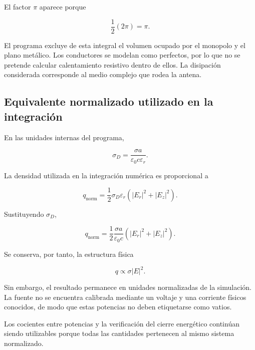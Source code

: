 El factor $\pi$ aparece porque

\begin{equation}
\frac{1}{2}(2\pi)=\pi.
\end{equation}

El programa excluye de esta integral el volumen ocupado por el monopolo y el plano metálico. Los conductores se modelan como perfectos, por lo que no se pretende calcular calentamiento resistivo dentro de ellos. La disipación considerada corresponde al medio complejo que rodea la antena.

\subsection{Equivalente normalizado utilizado en la integración}

En las unidades internas del programa,

\begin{equation}
\sigma_D
=
\frac{\sigma a}
{\varepsilon_0c\varepsilon_r}.
\end{equation}

La densidad utilizada en la integración numérica es proporcional a

\begin{equation}
q_{\mathrm{norm}}
=
\frac{1}{2}
\sigma_D\varepsilon_r
\left(
|E_r|^2+|E_z|^2
\right).
\end{equation}

Sustituyendo $\sigma_D$,

\begin{equation}
q_{\mathrm{norm}}
=
\frac{1}{2}
\frac{\sigma a}{\varepsilon_0c}
\left(
|E_r|^2+|E_z|^2
\right).
\end{equation}

Se conserva, por tanto, la estructura física

\begin{equation}
q\propto\sigma|E|^2.
\end{equation}

Sin embargo, el resultado permanece en unidades normalizadas de la simulación. La fuente no se encuentra calibrada mediante un voltaje y una corriente físicos conocidos, de modo que estas potencias no deben etiquetarse como vatios.

Los cocientes entre potencias y la verificación del cierre energético continúan siendo utilizables porque todas las cantidades pertenecen al mismo sistema normalizado.

